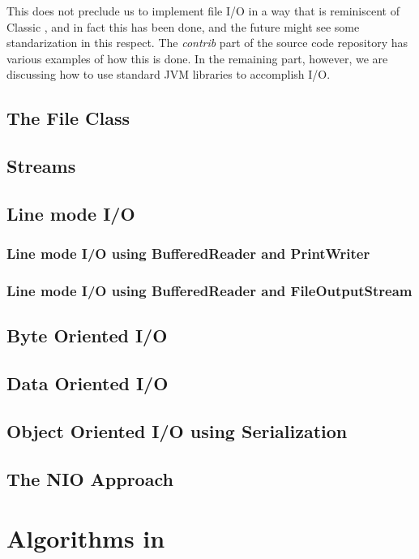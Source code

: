 This does not preclude us to implement file I/O in a way that is
reminiscent of Classic \Rexx{}, and in fact this has been done, and
the future might see some standarization in this respect. The
\emph{contrib} part of the \nr{} source code repository has various
  examples of how this is done. In the remaining part, however, we are
  discussing how to use standard JVM libraries to accomplish I/O.
\section{The File Class}
\section{Streams}
\section{Line mode I/O}
\subsection{Line mode I/O using BufferedReader and PrintWriter}
\subsection{Line mode I/O using BufferedReader and FileOutputStream}

\section{Byte Oriented I/O}
\section{Data Oriented I/O}
\section{Object Oriented I/O using Serialization}
\section{The NIO Approach}
\chapter{Algorithms in \nr}{}
